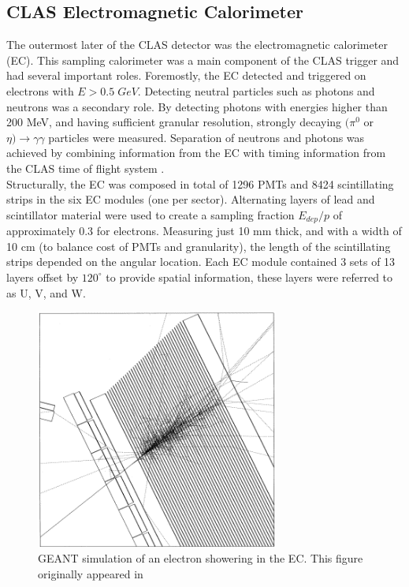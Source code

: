 \subsection{CLAS Electromagnetic Calorimeter}
The outermost later of the CLAS detector was the electromagnetic calorimeter (EC).  This sampling calorimeter was a main component of the CLAS trigger and had several important roles.  Foremostly, the EC detected and triggered on electrons with $E > 0.5 \; GeV$.  Detecting neutral particles such as photons and neutrons was a secondary role.  By detecting photons with energies higher than 200 MeV, and having sufficient granular resolution, strongly decaying $(\pi^0$ or $\eta) \rightarrow \gamma \gamma$ particles were measured.  Separation of neutrons and photons was achieved by combining information from the EC with timing information from the CLAS time of flight system \cite{hardware-amarian:2001}.  \\
Structurally, the EC was composed in total of 1296 PMTs and 8424 scintillating strips in the six EC modules (one per sector).  Alternating layers of lead and scintillator material were used to create a sampling fraction $E_{dep}/p$ of approximately 0.3 for electrons.  Measuring just 10 mm thick, and with a width of 10 cm (to balance cost of PMTs and granularity), the length of the scintillating strips depended on the angular location.  Each EC module contained 3 sets of 13 layers offset by $120^\circ$ to provide spatial information, these layers were referred to as U, V, and W.  

\begin{figure}
	\centering
		\includegraphics[width=8cm]{image/diagrams/ec-shower-geant.png}
		\caption{GEANT simulation of an electron showering in the EC.  This figure originally appeared in \cite{hardware-amarian:2001}}
\end{figure}
